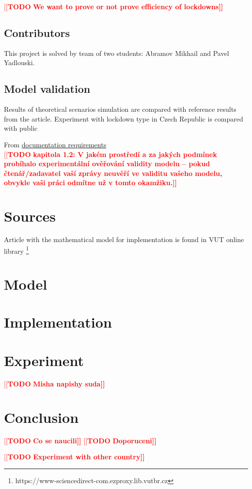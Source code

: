 \documentclass[12pt,a4paper]{article}
\newcommand{\todo}[1]{\textcolor{red}{[[\textbf{TODO} \textbf{#1]]}}}
\begin{document}
    \todo{We want to prove or not prove efficiency of lockdowns}
    \subsection{Contributors}    
    This project is solved by team of two students: Abramov Mikhail and Pavel 
    Yadlouski.

    \subsection{Model validation}
    Results of theoretical scenarios simulation are compared with reference results from the article. Experiment with lockdown type in Czech Republic is compared with public 
    
    From  \href{http://perchta.fit.vutbr.cz/vyuka-ims/16}{documentation requirements} \\
    \todo{kapitola 1.2: V jakém prostředí a za jakých podmínek probíhalo experimentální ověřování validity modelu – pokud čtenář/zadavatel vaší zprávy neuvěří ve validitu vašeho modelu, obvykle vaši práci odmítne už v tomto okamžiku.}
    
    \section{Sources}
    Article with the mathematical model \cite{article} for implementation is 
    found in VUT online library \footnote{https://www-sciencedirect-com.ezproxy.lib.vutbr.cz}
    
    \section{Model}
    \section{Implementation}
    \section{Experiment}
    \todo{Misha napishy suda}
    \section{Conclusion}
    \todo{Co se naucili}
    \todo{Doporuceni}

    \todo{Experiment with other country}
    \clearpage
	
	
\end{document}
